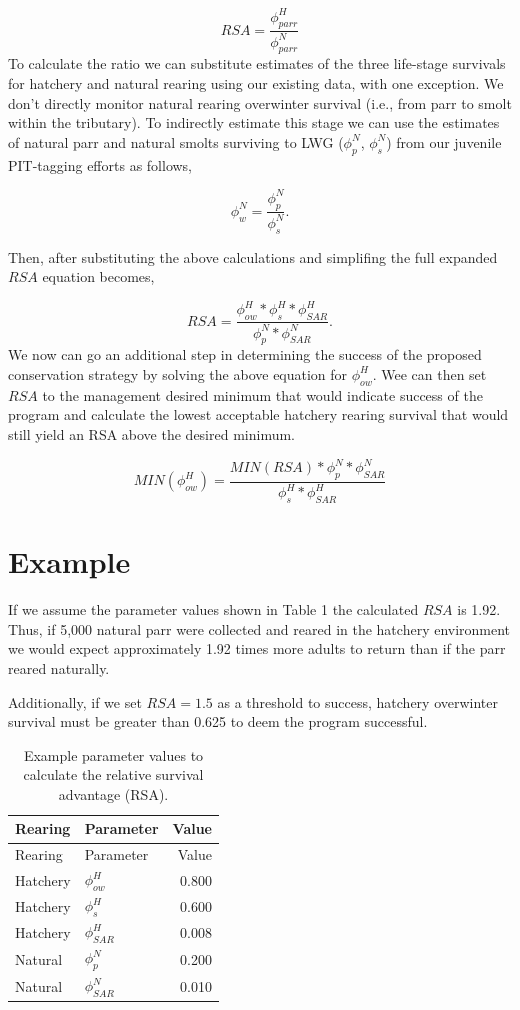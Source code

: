 \documentclass[10pt,a4paper,]{article}
\begin{document}
\[
RSA = \frac{\phi^{H}_{parr}}{\phi^{N}_{parr}}
\] To calculate the ratio we can substitute estimates of the three
life-stage survivals for hatchery and natural rearing using our existing
data, with one exception. We don't directly monitor natural rearing
overwinter survival (i.e., from parr to smolt within the tributary). To
indirectly estimate this stage we can use the estimates of natural parr
and natural smolts surviving to LWG (\(\phi^N_{p}\), \(\phi^N_{s}\))
from our juvenile PIT-tagging efforts as follows,

\[
\phi^N_w = \frac{\phi^N_{p}}{\phi^N_{s}}.
\]

Then, after substituting the above calculations and simplifing the full
expanded \(RSA\) equation becomes,

\[
RSA = \frac{\phi^H_{ow}*\phi^H_s*\phi^H_{SAR}}{\phi^N_p*\phi^N_{SAR}}.
\] We now can go an additional step in determining the success of the
proposed conservation strategy by solving the above equation for
\(\phi^H_{ow}\). Wee can then set \(RSA\) to the management desired
minimum that would indicate success of the program and calculate the
lowest acceptable hatchery rearing survival that would still yield an
RSA above the desired minimum.

\[
MIN(\phi^H_{ow}) =\frac{MIN(RSA)*\phi^N_p*\phi^N_{SAR}}{\phi^H_s*\phi^H_{SAR}}
\]

\hypertarget{example}{%
\section{Example}\label{example}}

If we assume the parameter values shown in Table 1 the calculated
\(RSA\) is 1.92. Thus, if 5,000 natural parr were collected and reared
in the hatchery environment we would expect approximately 1.92 times
more adults to return than if the parr reared naturally.

Additionally, if we set \(RSA = 1.5\) as a threshold to success,
hatchery overwinter survival must be greater than 0.625 to deem the
program successful.

\begin{longtable}[]{@{}llr@{}}
\caption{Example parameter values to calculate the relative survival
advantage (RSA).}\tabularnewline
\toprule\noalign{}
Rearing & Parameter & Value \\
\midrule\noalign{}
\endfirsthead
\toprule\noalign{}
Rearing & Parameter & Value \\
\midrule\noalign{}
\endhead
\bottomrule\noalign{}
\endlastfoot
Hatchery & \(\phi^H_{ow}\) & 0.800 \\
Hatchery & \(\phi^H_{s}\) & 0.600 \\
Hatchery & \(\phi^H_{SAR}\) & 0.008 \\
Natural & \(\phi^N_{p}\) & 0.200 \\
Natural & \(\phi^N_{SAR}\) & 0.010 \\
\end{longtable}

\printbibliography
\end{document}
